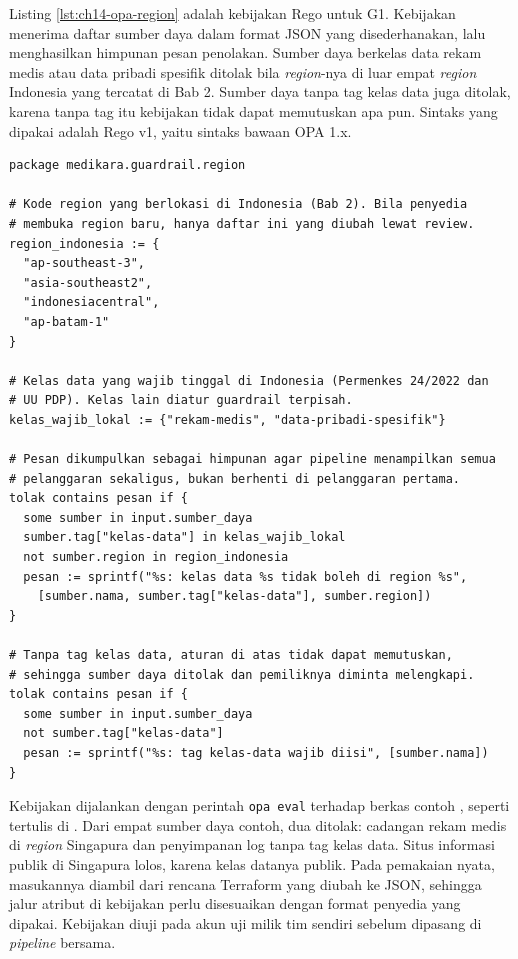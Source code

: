 \begin{pendalaman}[title={Pendalaman Teknis (opsional): Kebijakan Region dengan Open Policy Agent}]
  Listing \ref{lst:ch14-opa-region} adalah kebijakan Rego untuk G1. Kebijakan menerima daftar
  sumber daya dalam format JSON yang disederhanakan, lalu menghasilkan himpunan pesan penolakan.
  Sumber daya berkelas data rekam medis atau data pribadi spesifik ditolak bila \textit{region}-nya
  di luar empat \textit{region} Indonesia yang tercatat di Bab 2. Sumber daya tanpa tag kelas data
  juga ditolak, karena tanpa tag itu kebijakan tidak dapat memutuskan apa pun. Sintaks yang dipakai
  adalah Rego v1, yaitu sintaks bawaan OPA 1.x.

\begin{lstlisting}[language=ch14rego, style=ch14kode, caption={Kebijakan \textit{region} untuk
G1, tersedia di \berkas{sources/chapter14/contoh-opa/guardrail-region.rego}},
label={lst:ch14-opa-region}]
package medikara.guardrail.region

# Kode region yang berlokasi di Indonesia (Bab 2). Bila penyedia
# membuka region baru, hanya daftar ini yang diubah lewat review.
region_indonesia := {
  "ap-southeast-3",
  "asia-southeast2",
  "indonesiacentral",
  "ap-batam-1"
}

# Kelas data yang wajib tinggal di Indonesia (Permenkes 24/2022 dan
# UU PDP). Kelas lain diatur guardrail terpisah.
kelas_wajib_lokal := {"rekam-medis", "data-pribadi-spesifik"}

# Pesan dikumpulkan sebagai himpunan agar pipeline menampilkan semua
# pelanggaran sekaligus, bukan berhenti di pelanggaran pertama.
tolak contains pesan if {
  some sumber in input.sumber_daya
  sumber.tag["kelas-data"] in kelas_wajib_lokal
  not sumber.region in region_indonesia
  pesan := sprintf("%s: kelas data %s tidak boleh di region %s",
    [sumber.nama, sumber.tag["kelas-data"], sumber.region])
}

# Tanpa tag kelas data, aturan di atas tidak dapat memutuskan,
# sehingga sumber daya ditolak dan pemiliknya diminta melengkapi.
tolak contains pesan if {
  some sumber in input.sumber_daya
  not sumber.tag["kelas-data"]
  pesan := sprintf("%s: tag kelas-data wajib diisi", [sumber.nama])
}
\end{lstlisting}

  Kebijakan dijalankan dengan perintah \texttt{opa eval} terhadap berkas contoh
  , seperti tertulis di
  . Dari empat sumber daya contoh, dua ditolak: cadangan rekam
  medis di \textit{region} Singapura dan penyimpanan log tanpa tag kelas data. Situs informasi
  publik di Singapura lolos, karena kelas datanya publik. Pada pemakaian nyata, masukannya diambil
  dari rencana Terraform yang diubah ke JSON, sehingga jalur atribut di kebijakan perlu disesuaikan
  dengan format penyedia yang dipakai. Kebijakan diuji pada akun uji milik tim sendiri sebelum
  dipasang di \textit{pipeline} bersama.
\end{pendalaman}

